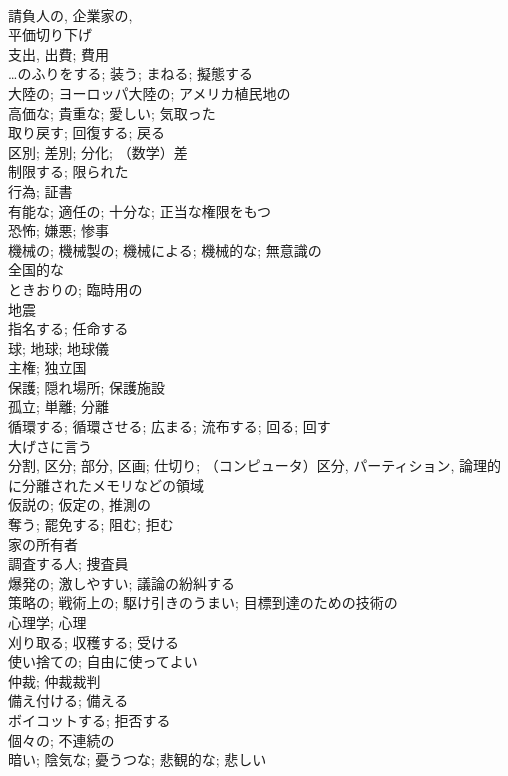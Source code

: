 \documentclass[8pt]{extreport}
\begin{document}
\begin{CJK}{UTF8}{min}
\\	請負人の, 企業家の,
\\	平価切り下げ	
\\	支出, 出費; 費用	
\\	…のふりをする; 装う; まねる; 擬態する	
\\	大陸の; ヨーロッパ大陸の; アメリカ植民地の	
\\	高価な; 貴重な; 愛しい; 気取った	
\\	取り戻す; 回復する; 戻る	
\\	区別; 差別; 分化; （数学）差	
\\	制限する; 限られた	
\\	行為; 証書	
\\	有能な; 適任の; 十分な; 正当な権限をもつ	
\\	恐怖; 嫌悪; 惨事	
\\	機械の; 機械製の; 機械による; 機械的な; 無意識の	
\\	全国的な	
\\	ときおりの; 臨時用の	
\\	地震	
\\	指名する; 任命する	
\\	球; 地球; 地球儀	
\\	主権; 独立国	
\\	保護; 隠れ場所; 保護施設	
\\	孤立; 単離; 分離	
\\	循環する; 循環させる; 広まる; 流布する; 回る; 回す	
\\	大げさに言う	
\\	分割, 区分; 部分, 区画; 仕切り; （コンピュータ）区分, パーティション, 論理的に分離されたメモリなどの領域	
\\	仮説の; 仮定の, 推測の	
\\	奪う; 罷免する; 阻む; 拒む	
\\	家の所有者	
\\	調査する人; 捜査員	
\\	爆発の; 激しやすい; 議論の紛糾する	
\\	策略の; 戦術上の; 駆け引きのうまい; 目標到達のための技術の	
\\	心理学; 心理	
\\	刈り取る; 収穫する; 受ける	
\\	使い捨ての; 自由に使ってよい	
\\	仲裁; 仲裁裁判	
\\	備え付ける; 備える	
\\	ボイコットする; 拒否する	
\\	個々の; 不連続の	
\\	暗い; 陰気な; 憂うつな; 悲観的な; 悲しい	

\end{CJK}
\end{document}
